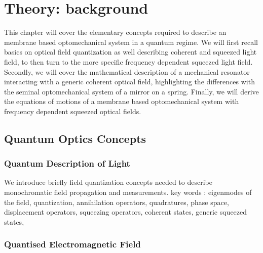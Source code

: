\newcommand{\adag}[1]{\hat{a}_{#1}^\dagger}
\newcommand{\aop}[1]{\hat{a}_{#1\vphantom{\dagger}}}

\chapter{ Theory: background} \label{chap:theory}
This chapter will cover the elementary concepts required to describe an membrane based optomechanical system in a quantum regime. We will first recall basics on optical field quantization as well describing coherent and squeezed light field, to then turn to the more specific frequency dependent squeezed light field. Secondly, we will cover the mathematical description of a mechanical resonator interacting with a generic coherent optical field, highlighting the differences with the seminal optomechanical system of a mirror on a spring. Finally, we will derive the equations of motions of a membrane based optomechanical system with frequency dependent squeezed optical fields. 

\section{Quantum Optics Concepts}
\subsection{Quantum Description of Light}
We introduce briefly field quantization concepts needed to describe monochromatic field propagation and measurements.
key words : eigenmodes of the field, quantization, annihilation operators, quadratures, phase space, displacement operators, squeezing operators, coherent states, generic squeezed states,


\subsection*{Quantised Electromagnetic Field}

